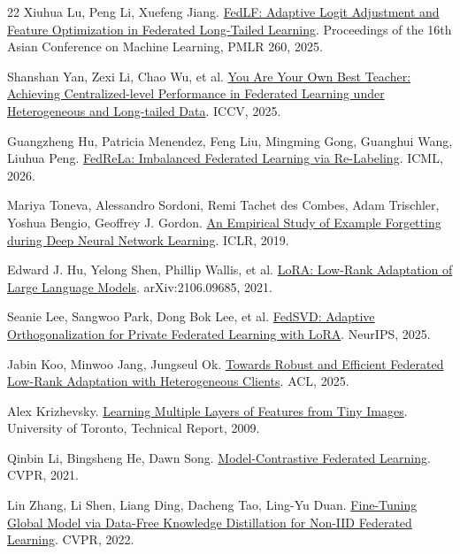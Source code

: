 \documentclass[10pt,twocolumn,letterpaper]{article}
\begin{document}
\begin{thebibliography}{22}
Xiuhua Lu, Peng Li, Xuefeng Jiang. \href{https://proceedings.mlr.press/v260/lu25a.html}{FedLF: Adaptive Logit Adjustment and Feature Optimization in Federated Long-Tailed Learning}. Proceedings of the 16th Asian Conference on Machine Learning, PMLR 260, 2025.

Shanshan Yan, Zexi Li, Chao Wu, et al. \href{https://openaccess.thecvf.com/content/ICCV2025/html/Yan_You_Are_Your_Own_Best_Teacher_Achieving_Centralized-level_Performance_in_ICCV_2025_paper.html}{You Are Your Own Best Teacher: Achieving Centralized-level Performance in Federated Learning under Heterogeneous and Long-tailed Data}. ICCV, 2025.

Guangzheng Hu, Patricia Menendez, Feng Liu, Mingming Gong, Guanghui Wang, Liuhua Peng. \href{https://proceedings.mlr.press/v306/hu26ao.html}{FedReLa: Imbalanced Federated Learning via Re-Labeling}. ICML, 2026.

Mariya Toneva, Alessandro Sordoni, Remi Tachet des Combes, Adam Trischler, Yoshua Bengio, Geoffrey J. Gordon. \href{https://arxiv.org/abs/1812.05159}{An Empirical Study of Example Forgetting during Deep Neural Network Learning}. ICLR, 2019.

Edward J. Hu, Yelong Shen, Phillip Wallis, et al. \href{https://arxiv.org/abs/2106.09685}{LoRA: Low-Rank Adaptation of Large Language Models}. arXiv:2106.09685, 2021.

Seanie Lee, Sangwoo Park, Dong Bok Lee, et al. \href{https://arxiv.org/abs/2505.12805}{FedSVD: Adaptive Orthogonalization for Private Federated Learning with LoRA}. NeurIPS, 2025.

Jabin Koo, Minwoo Jang, Jungseul Ok. \href{https://aclanthology.org/2025.acl-long.19/}{Towards Robust and Efficient Federated Low-Rank Adaptation with Heterogeneous Clients}. ACL, 2025.

Alex Krizhevsky. \href{https://www.cs.toronto.edu/~kriz/learning-features-2009-TR.pdf}{Learning Multiple Layers of Features from Tiny Images}. University of Toronto, Technical Report, 2009.

Qinbin Li, Bingsheng He, Dawn Song. \href{https://openaccess.thecvf.com/content/CVPR2021/html/Li_Model-Contrastive_Federated_Learning_CVPR_2021_paper.html}{Model-Contrastive Federated Learning}. CVPR, 2021.

Lin Zhang, Li Shen, Liang Ding, Dacheng Tao, Ling-Yu Duan. \href{https://openaccess.thecvf.com/content/CVPR2022/html/Zhang_Fine-Tuning_Global_Model_via_Data-Free_Knowledge_Distillation_for_Non-IID_Federated_CVPR_2022_paper.html}{Fine-Tuning Global Model via Data-Free Knowledge Distillation for Non-IID Federated Learning}. CVPR, 2022.


\end{thebibliography}
\end{document}
